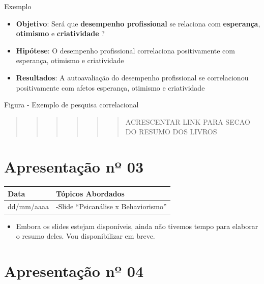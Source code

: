 \documentclass[
]{book}
\providecommand{\tightlist}{%
  \setlength{\itemsep}{0pt}\setlength{\parskip}{0pt}}
\begin{document}
Exemplo

\begin{itemize}
\tightlist
\item
  \textbf{Objetivo}: Será que \textbf{desempenho profissional} se relaciona com \textbf{esperança}, \textbf{otimismo} e \textbf{criatividade} ?
\item
  \textbf{Hipótese}: O desempenho profissional correlaciona positivamente com esperança, otimismo e criatividade
\item
  \textbf{Resultados}: A autoavaliação do desempenho profissional se correlacionou positivamente com afetos esperança, otimismo e criatividade
\end{itemize}

Figura - Exemplo de pesquisa correlacional

\begin{quote}
\begin{quote}
\begin{quote}
\begin{quote}
\begin{quote}
\begin{quote}
ACRESCENTAR LINK PARA SECAO DO RESUMO DOS LIVROS
\end{quote}
\end{quote}
\end{quote}
\end{quote}
\end{quote}
\end{quote}

\hypertarget{apresentauxe7uxe3o-nuxba-03}{%
\section{Apresentação nº 03}\label{apresentauxe7uxe3o-nuxba-03}}

\begin{longtable}[]{@{}ll@{}}
\toprule()
Data & Tópicos Abordados \\
\midrule()
\endhead
dd/mm/aaaa & -Slide ``Psicanálise x Behaviorismo'' \\
\bottomrule()
\end{longtable}

\begin{itemize}
\tightlist
\item
  Embora os slides estejam disponíveis, ainda não tivemos tempo para elaborar o resumo deles. Vou disponibilizar em breve.
\end{itemize}

\hypertarget{apresentauxe7uxe3o-nuxba-04}{%
\section{Apresentação nº 04}\label{apresentauxe7uxe3o-nuxba-04}}
\end{document}
